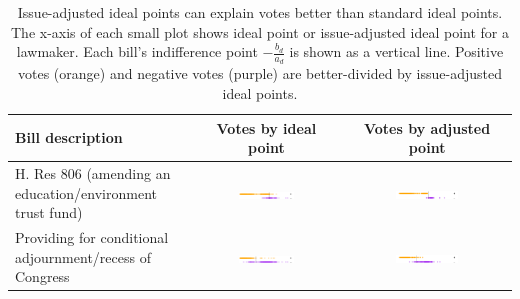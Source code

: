 \begin{table} 
  \caption{Issue-adjusted ideal points can explain votes better than
  standard ideal points.  The x-axis of each small plot shows ideal
  point or issue-adjusted ideal point for a lawmaker. Each bill's
  indifference point $-\frac{b_d}{a_d}$ is shown as a vertical
  line. Positive votes (orange) and negative votes (purple) are
  better-divided by issue-adjusted ideal points.}
  \label{table:issue_adjustments}
  \setlength{\extrarowheight}{1.5pt}
  \renewcommand{\arraystretch}{1.5}
  \hspace{-40pt} \begin{tabular}{|p{4.3cm}|c|c|}
\hline
\textbf{Bill description}
& \textbf{Votes by ideal point}
& \textbf{Votes by adjusted point} \\
\hline
H. Res 806 (amending an education/environment trust fund)
 & \includegraphics[width=0.4\textwidth]{chapter_spatial_voting_with_text/figures/3397_ideal_point_10.pdf}
 & \includegraphics[width=0.4\textwidth]{chapter_spatial_voting_with_text/figures/3397_adjusted_ideal_point_10.pdf} \\

Providing for conditional adjournment/recess of Congress
& \includegraphics[width=0.4\textwidth]{chapter_spatial_voting_with_text/figures/3397_ideal_point_9.pdf}
& \includegraphics[width=0.4\textwidth]{chapter_spatial_voting_with_text/figures/3397_adjusted_ideal_point_9.pdf} \\


\end{tabular}
\end{table}
